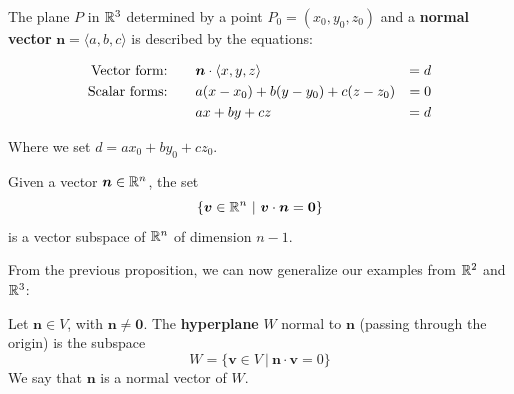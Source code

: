 \begin{definition}
\begin{center}
	\end{center}

    
    \end{definition}

    
    \begin{theorem}
    The plane $P$ in $\mathbb{R}^3$ determined by a point $P_0 = (x_0, y_0, z_0)$ and a \textbf{normal vector} $\bm{n} = \langle a, b, c \rangle$ is described by the equations:
    
    \begin{align*}
        \textnormal{Vector form:} \qquad & \bm{n} \cdot \langle x, y , z \rangle &= d \\
        \textnormal{Scalar forms:} \qquad &  a(x-x_0) + b(y-y_0) + c(z-z_0) &= 0 \\
         & ax + by + cz &= d
    \end{align*}
    
    Where we set $d = ax_0 + by_0 + cz_0$.
    
    \end{theorem}


\begin{proposition}
    Given a vector $\bm{n} \in \mathbb{R}^n$, the set $$\{\bm{v} \in \mathbb{R}^n \ | \ \bm{v} \cdot \bm{n} = \bm{0}\}$$ is a vector subspace of $\mathbb{R}^n$ of dimension $n-1$.
\end{proposition}


From the previous proposition, we can now generalize our examples from $\mathbb{R}^2$ and $\mathbb{R}^3$:

\begin{definition}
Let $\bm{n} \in V$, with $\bm{n} \neq \bm{0}$.  The \textbf{hyperplane} $W$ normal to $\bm{n}$ (passing through the origin) is the subspace $$W = \{ \bm{v} \in V \ | \ \bm{n} \cdot \bm{v}  = 0 \}$$
We say that $\bm{n}$ is a normal vector of $W$.
\end{definition}









